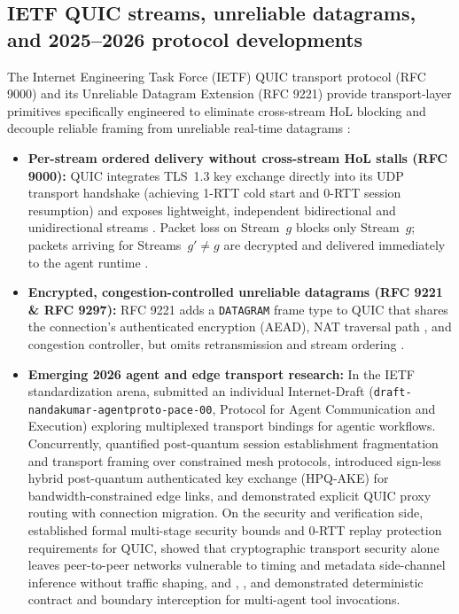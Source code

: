 \documentclass[11pt]{article}
\begin{document}
\subsection{IETF QUIC streams, unreliable datagrams, and 2025--2026 protocol developments}

The Internet Engineering Task Force (IETF) QUIC transport protocol (RFC 9000) \citep{iyengar2021rfc9000, langley2017quic} and its Unreliable Datagram Extension (RFC 9221) \citep{pauly2022rfc9221} provide transport-layer primitives specifically engineered to eliminate cross-stream HoL blocking and decouple reliable framing from unreliable real-time datagrams \citep{schinazi2022rfc9297, kuehlewind2022rfc9308}:
\begin{itemize}
  \item \textbf{Per-stream ordered delivery without cross-stream HoL stalls (RFC 9000):} QUIC integrates TLS~1.3 key exchange directly into its UDP transport handshake (achieving 1-RTT cold start and 0-RTT session resumption) and exposes lightweight, independent bidirectional and unidirectional streams \citep{iyengar2021rfc9000, rescorla2018rfc8446}. Packet loss on Stream~$g$ blocks only Stream~$g$; packets arriving for Streams~$g' \neq g$ are decrypted and delivered immediately to the agent runtime \citep{kuehlewind2022rfc9308}.
  \item \textbf{Encrypted, congestion-controlled unreliable datagrams (RFC 9221 \& RFC 9297):} RFC 9221 adds a \texttt{DATAGRAM} frame type to QUIC that shares the connection's authenticated encryption (AEAD), NAT traversal path \citep{ari2018_18}, and congestion controller, but omits retransmission and stream ordering \citep{pauly2022rfc9221, schinazi2022rfc9297}.
  \item \textbf{Emerging 2026 agent and edge transport research:} In the IETF standardization arena, \citet{nandakumar2026pace} submitted an individual Internet-Draft (\texttt{draft-nandakumar-agentproto-pace-00}, Protocol for Agent Communication and Execution) exploring multiplexed transport bindings for agentic workflows. Concurrently, \citet{commey2026matter} quantified post-quantum session establishment fragmentation and transport framing over constrained mesh protocols, \citet{phamtuan2026hpqake} introduced sign-less hybrid post-quantum authenticated key exchange (HPQ-AKE) for bandwidth-constrained edge links, and \citet{buchet2026quicproxies} demonstrated explicit QUIC proxy routing with connection migration. On the security and verification side, \citet{fischlin2024quic} established formal multi-stage security bounds and 0-RTT replay protection requirements for QUIC, \citet{arote2026renegade} showed that cryptographic transport security alone leaves peer-to-peer networks vulnerable to timing and metadata side-channel inference without traffic shaping, and \citet{xiong2026skillguard}, \citet{arxiv2604_11790}, and \citet{elina2026maat} demonstrated deterministic contract and boundary interception for multi-agent tool invocations.
\end{itemize}
\end{document}
